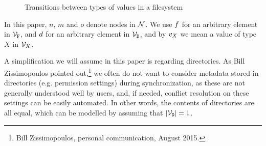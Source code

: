 \begin{figure}[htb]

\caption{Transitions between types of values in a filesystem}\label{fig_transition}
\end{figure}

In this paper, $n$, $m$ and $o$ denote nodes in $\mathcal{N}$.
We use $f$ for an arbitrary element in $\mathcal{V}_{\mathtt{F}}$, 
and $d$ for an arbitrary element in $\mathcal{V}_{\mathtt{D}}$,
and by $v_X$ we mean a value of type $X$ in $\mathcal{V}_{X}$.


A simplification we will assume in this paper is regarding directories.
As Bill Zissimopoulos pointed 
out,\footnote{Bill Zissimopoulos, personal communication, August 2015.} 
we often do not want to consider metadata stored in
directories (e.g. permission settings) during synchronization,
as these are not generally understood well by users,
and, if needed, conflict resolution on these settings can be easily automated.
In other words, the contents of directories are all equal,
which can be modelled by assuming that $|\mathcal{V}_{\mathtt{D}}|=1$.
